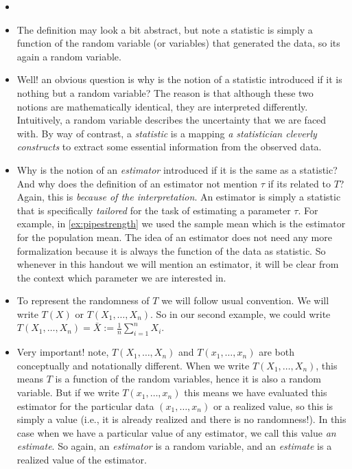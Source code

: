 \documentclass[ 11pt,%
				a4paper,%
				twoside,%
				headinclude,%
				footinclude = true,%
				cleardoublepage = empty,%
				reqno]{scrbook}
\begin{document}
\begin{remarks}

\begin{itemize}
    \item[] 

    \item The definition may look a bit abstract, but note a statistic is simply a function of the random variable (or variables) that generated the data, so its again a random variable.

    \item Well! an obvious question is why is the notion of a statistic introduced if it is nothing but a random variable? The reason is that although these two notions are mathematically identical, they are interpreted differently. Intuitively, a random variable describes the uncertainty that we are faced with. By way of contrast, a \emph{statistic} is a mapping \emph{a statistician cleverly constructs} to extract some essential information from the observed data.


    \item Why is the notion of an \emph{estimator} introduced if it is the same as a statistic? And why does the definition of an estimator not mention $\tau$ if its related to $T$? Again, this is \emph{because of the interpretation}. An estimator is simply a statistic that is specifically \emph{tailored} for the task of estimating a parameter $\tau $. For example, in \cref{ex:pipestrength} we used the sample mean which is the estimator for the population mean. The idea of an estimator does not need any more formalization because it is always the function of the data as statistic. So whenever in this handout we will mention an estimator, it will be clear from the context which parameter we are interested in. 

    \item To represent the randomness of $T$ we will follow usual convention. We will write $T(X)$ or $T(X_1, \ldots, X_n)$. So in our second example, we could write $T(X_1, \ldots, X_n) = \bar{X}:=\frac{1}{n} \sum_{i=1}^{n} X_{i}$. 

    \item Very important! note, $T(X_1, \ldots, X_n)$ and $T(x_1, \ldots, x_n)$ are both conceptually and notationally different. When we write $T(X_1, \ldots, X_n)$, this means $T$ is a function of the random variables, hence it is also a random variable. But if we write $T(x_1, \ldots, x_n)$ this means we have evaluated this estimator for the particular data $(x_1, \ldots, x_n)$ or a realized value, so this is simply a value (i.e., it is already realized and there is no randomness!). In this case when we have a particular value of any estimator, we call this value \emph{an estimate}. So again, an \emph{estimator} is a random variable, and an \emph{estimate} is a realized value of the estimator.


\end{itemize}
\end{remarks}
\end{document}
